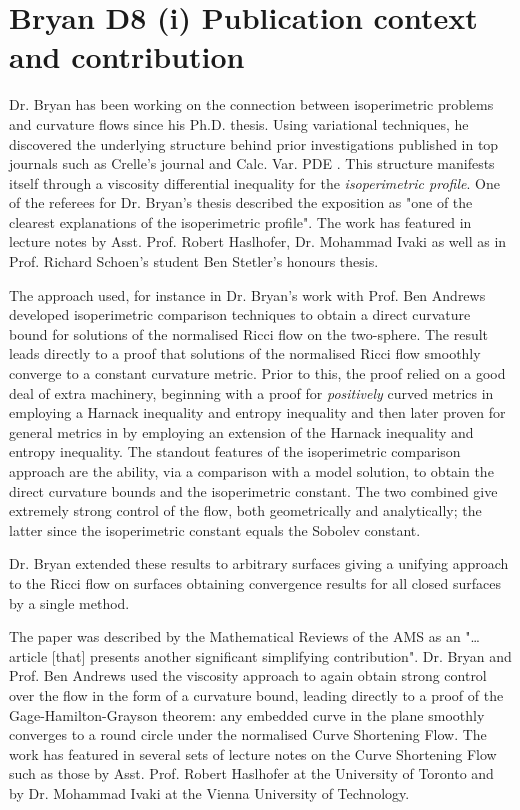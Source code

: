 \documentclass[12pt]{article}
\author{Paul Bryan}
\date{}
\title{}
\begin{document}
\section*{Bryan D8 (i) Publication context and contribution}
\label{sec:org29462d3}

Dr. Bryan has been working on the connection between isoperimetric problems and curvature flows since his Ph.D. thesis. Using variational techniques, he discovered the underlying structure behind prior investigations published in top journals such as Crelle's journal and Calc. Var. PDE \cite{MR2729306,MR2794630,MR2843240,Bryan}. This structure manifests itself through a viscosity differential inequality for the \emph{isoperimetric profile}. One of the referees for Dr. Bryan's thesis described the exposition as "one of the clearest explanations of the isoperimetric profile". The work has featured in lecture notes by Asst. Prof. Robert Haslhofer, Dr. Mohammad Ivaki as well as in Prof. Richard Schoen's student Ben Stetler's honours thesis.

The approach used, for instance in Dr. Bryan's work with Prof. Ben Andrews \cite{MR2729306} developed isoperimetric comparison techniques to obtain a direct curvature bound for solutions of the normalised Ricci flow on the two-sphere. The result leads directly to a proof that solutions of the normalised Ricci flow smoothly converge to a constant curvature metric. Prior to this, the proof relied on a good deal of extra machinery, beginning with a proof for \emph{positively} curved metrics in employing a Harnack inequality and entropy inequality and then later proven for general metrics in by employing an extension of the Harnack inequality and entropy inequality. The standout features of the isoperimetric comparison approach are the ability, via a comparison with a model solution, to obtain the direct curvature bounds and the isoperimetric constant. The two combined give extremely strong control of the flow, both geometrically and analytically; the latter since the isoperimetric constant equals the Sobolev constant.

Dr. Bryan extended these results to arbitrary surfaces \cite{Bryan} giving a unifying approach to the Ricci flow on surfaces obtaining convergence results for all closed surfaces by a single method.

The paper \cite{MR2794630} was described by the Mathematical Reviews of the AMS as an "\ldots{}article [that] presents another significant simplifying contribution". Dr. Bryan and Prof. Ben Andrews used the viscosity approach to again obtain strong control over the flow in the form of a curvature bound, leading directly to a proof of the Gage-Hamilton-Grayson theorem: any embedded curve in the plane smoothly converges to a round circle under the normalised Curve Shortening Flow. The work has featured in several sets of lecture notes on the Curve Shortening Flow such as those by Asst. Prof. Robert Haslhofer at the University of Toronto and by Dr. Mohammad Ivaki at the Vienna University of Technology.
\end{document}
